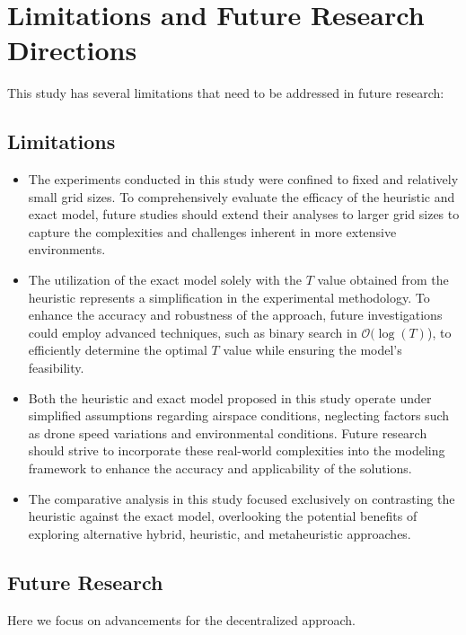 \section{Limitations and Future Research Directions}



This study has several limitations that need to be addressed in future research:

\subsection{Limitations}

\begin{itemize}
    \item The experiments conducted in this study were confined to fixed and relatively small grid sizes. To comprehensively evaluate the efficacy of the heuristic and exact model, future studies should extend their analyses to larger grid sizes to capture the complexities and challenges inherent in more extensive environments.
    \item The utilization of the exact model solely with the $T$ value obtained from the heuristic represents a simplification in the experimental methodology. To enhance the accuracy and robustness of the approach, future investigations could employ advanced techniques, such as binary search in $\mathcal{O}( \log( T)$), to efficiently determine the optimal $T$ value while ensuring the model's feasibility.
    \item Both the heuristic and exact model proposed in this study operate under simplified assumptions regarding airspace conditions, neglecting factors such as drone speed variations and environmental conditions. Future research should strive to incorporate these real-world complexities into the modeling framework to enhance the accuracy and applicability of the solutions.
    \item The comparative analysis in this study focused exclusively on contrasting the heuristic against the exact model, overlooking the potential benefits of exploring alternative hybrid, heuristic, and metaheuristic approaches.
\end{itemize}



\subsection{Future Research}

Here we focus on advancements for the decentralized approach.

